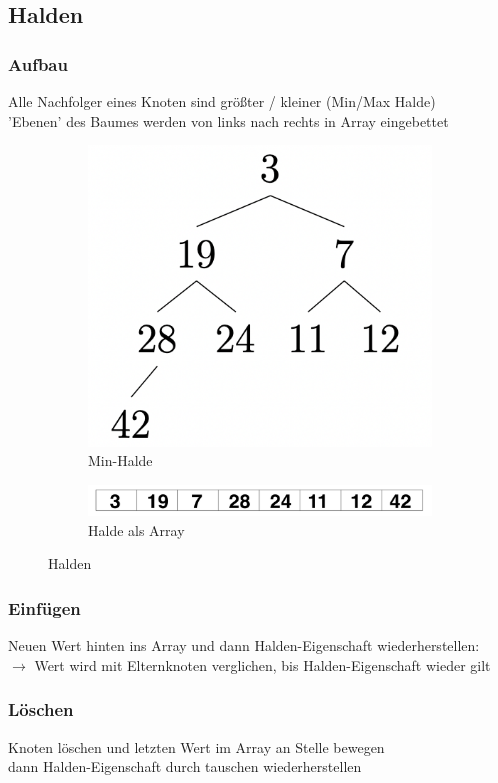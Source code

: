 \documentclass{article}
\begin{document}
	\subsection{Halden}
	\subsubsection*{Aufbau}
	Alle Nachfolger eines Knoten sind größter / kleiner (Min/Max Halde)
	\\'Ebenen' des Baumes werden von links nach rechts in Array eingebettet
		\begin{figure}[H]
			\centering
			\begin{subfigure}{.5\textwidth}
				\centering
				\includegraphics[width=.5\linewidth]{Abbildungen/halde}
				\caption{Min-Halde}
				\label{fig:halde}
			\end{subfigure}%
			\begin{subfigure}{.5\textwidth}
				\centering
				\includegraphics[width=0.7\linewidth]{Abbildungen/haldearr}
				\caption{Halde als Array}
				\label{fig:haldearr}
			\end{subfigure}%
			\caption{Halden}
		\end{figure}
	\subsubsection*{Einfügen}
	Neuen Wert hinten ins Array und dann Halden-Eigenschaft wiederherstellen:
	\\$\rightarrow$ Wert wird mit Elternknoten verglichen, bis Halden-Eigenschaft wieder gilt
	\subsubsection*{Löschen}
	Knoten löschen und letzten Wert im Array an Stelle bewegen
	\\dann Halden-Eigenschaft durch tauschen wiederherstellen
	
\end{document}

